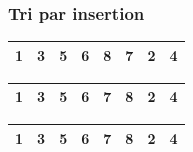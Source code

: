 \begin{frame}
\frametitle{Tri par insertion}
\begin{table}
\begin{tabular}{| c | c | c | c | c | c | c | c |}
\hline
\cellcolor{blue!25}1 & \cellcolor{blue!25}3 & \cellcolor{blue!25}5 & \cellcolor{blue!25}6 & \cellcolor{blue!25}8 & \cellcolor{red!25}7 & 2 & 4 \\ 
\hline
\end{tabular}
\end{table}
\begin{table}
\begin{tabular}{| c | c | c | c | c | c | c | c |}
\hline
\cellcolor{blue!25}1 & \cellcolor{blue!25}3 & \cellcolor{blue!25}5 & \cellcolor{blue!25}6 & \cellcolor{red!25}7 & \cellcolor{blue!25}8 & 2 & 4 \\ 
\hline
\end{tabular}
\end{table}
\begin{table}
\begin{tabular}{| c | c | c | c | c | c | c | c |}
\hline
\cellcolor{blue!25}1 & \cellcolor{blue!25}3 & \cellcolor{blue!25}5 & \cellcolor{blue!25}6 & \cellcolor{blue!25}7 & \cellcolor{blue!25}8 & 2 & 4 \\ 
\hline
\end{tabular}
\end{table}
\end{frame}


